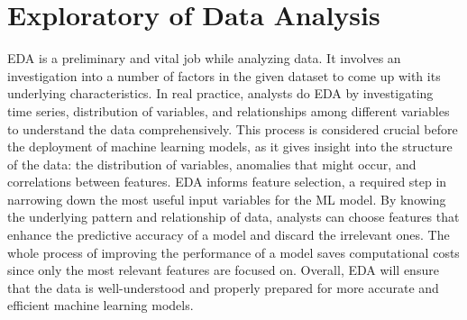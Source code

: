 \documentclass[12pt, a4paper,twoside]{report}
\theoremstyle{plain} %
\theoremstyle{definition} %
\theoremstyle{remark} %
\numberwithin{equation}{chapter}
\begin{document}
\section{Exploratory of Data Analysis}
EDA is a preliminary and vital job while analyzing data. It involves an investigation into a number of factors in the given dataset to come up with its underlying characteristics. In real practice, analysts do EDA by investigating time series, distribution of variables, and relationships among different variables to understand the data comprehensively. This process is considered crucial before the deployment of machine learning models, as it gives insight into the structure of the data: the distribution of variables, anomalies that might occur, and correlations between features. EDA informs feature selection, a required step in narrowing down the most useful input variables for the ML model. By knowing the underlying pattern and relationship of data, analysts can choose features that enhance the predictive accuracy of a model and discard the irrelevant ones. The whole process of improving the performance of a model saves computational costs since only the most relevant features are focused on. Overall, EDA will ensure that the data is well-understood and properly prepared for more accurate and efficient machine learning models.
\end{document}

